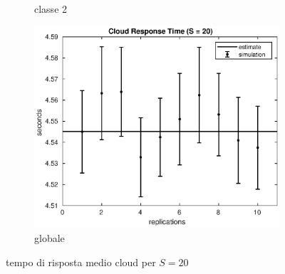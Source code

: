 \begin{figure}[!h]
\begin{subfigure}[t]{0.49\textwidth}
\caption{classe 2}
\label{20_s2cloud}
\end{subfigure}
%
\begin{subfigure}[t]{0.5\textwidth}
\includegraphics[width=\textwidth]{figures/simul/20_500K_scloud}
\caption{globale}
\label{20_scloud}
\end{subfigure}
%
\caption{tempo di risposta medio cloud per $S = 20$}
\end{figure}
%

